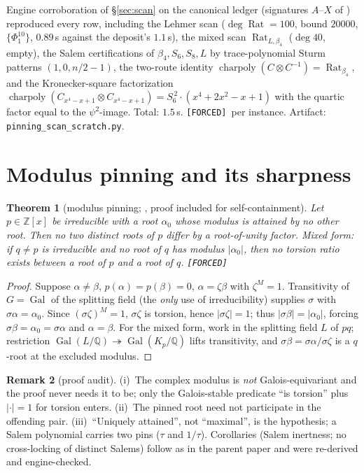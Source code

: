 \documentclass[11pt]{article}
\newcommand{\F}{\textnormal{\texttt{[FORCED]}}}
\newcommand{\Q}{\mathbb{Q}}
\newcommand{\Z}{\mathbb{Z}}
\newcommand{\Rat}{\operatorname{Rat}}
\newcommand{\Gal}{\operatorname{Gal}}
\newtheorem{theorem}{Theorem}[section]
\theoremstyle{definition}
\newtheorem{remark}[theorem]{Remark}
\begin{document}
Engine corroboration of \S\ref{sec:scan} on the canonical ledger (signatures
$A$--$X$ of \cite{relcharge}) reproduced every row, including the Lehmer scan
($\deg\Rat=100$, bound $20000$, $\{\Phi_1^{10}\}$, $0.89$\,s against the
deposit's $1.1$\,s), the mixed scan $\Rat_{L,\beta_4}$ ($\deg 40$, empty), the
Salem certifications of $\beta_4,S_6,S_8,L$ by trace-polynomial Sturm patterns
$(1,0,n/2-1)$, the two-route identity
$\operatorname{charpoly}(C\otimes C^{-1})=\Rat_{\beta_4}$, and the
Kronecker-square factorization
$\operatorname{charpoly}(C_{x^4-x+1}\otimes C_{x^4-x+1})=S_6^{\,2}\cdot(x^4+2x^2-x+1)$
with the quartic factor equal to the $\psi^2$-image. Total: $1.5$\,s. \F\ per
instance. Artifact: \texttt{pinning\_scan\_scratch.py}.

\section{Modulus pinning and its sharpness}\label{sec:pinning}

\begin{theorem}[modulus pinning; {\cite[Thm.~7.13]{relcharge}}, proof included for
self-containment]\label{thm:pin}
Let $p\in\Z[x]$ be irreducible with a root $\alpha_0$ whose modulus is attained
by no other root. Then no two distinct roots of $p$ differ by a root-of-unity
factor. Mixed form: if $q\neq p$ is irreducible and no root of $q$ has modulus
$|\alpha_0|$, then no torsion ratio exists between a root of $p$ and a root of
$q$. \F
\end{theorem}

\begin{proof}
Suppose $\alpha\neq\beta$, $p(\alpha)=p(\beta)=0$, $\alpha=\zeta\beta$ with
$\zeta^M=1$. Transitivity of $G=\Gal$ of the splitting field (the \emph{only}
use of irreducibility) supplies $\sigma$ with $\sigma\alpha=\alpha_0$. Since
$(\sigma\zeta)^M=1$, $\sigma\zeta$ is torsion, hence $|\sigma\zeta|=1$; thus
$|\sigma\beta|=|\alpha_0|$, forcing $\sigma\beta=\alpha_0=\sigma\alpha$ and
$\alpha=\beta$. For the mixed form, work in the splitting field $L$ of $pq$;
restriction $\Gal(L/\Q)\twoheadrightarrow\Gal(K_p/\Q)$ lifts transitivity, and
$\sigma\beta=\sigma\alpha/\sigma\zeta$ is a $q$-root at the excluded modulus.
\end{proof}

\begin{remark}[proof audit]\label{rem:audit}
(i)~The complex modulus is \emph{not} Galois-equivariant and the proof never
needs it to be; only the Galois-stable predicate ``is torsion'' plus $|{\cdot}|=1$
for torsion enters. (ii)~The pinned root need not participate in the offending
pair. (iii)~``Uniquely attained'', not ``maximal'', is the hypothesis; a Salem
polynomial carries two pins ($\tau$ and $1/\tau$). Corollaries
\cite[7.14, 7.15]{relcharge} (Salem inertness; no cross-locking of distinct
Salems) follow as in the parent paper and were re-derived and engine-checked.
\end{remark}
\end{document}
